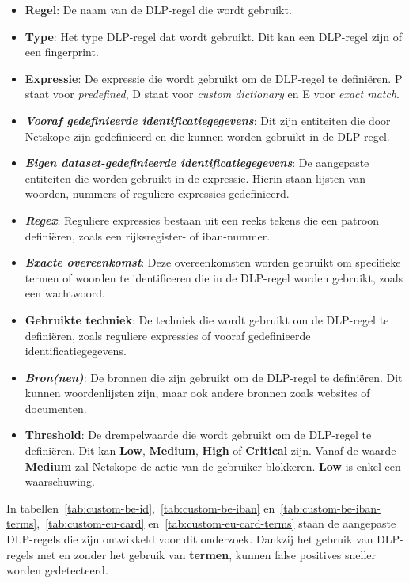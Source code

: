 {\small
\begin{itemize}
    \item \textbf{Regel}: De naam van de DLP-regel die wordt gebruikt.
    \item \textbf{Type}: Het type DLP-regel dat wordt gebruikt. Dit kan een DLP-regel zijn of een fingerprint.
    \item \textbf{Expressie}: De expressie die wordt gebruikt om de DLP-regel te definiëren. P staat voor \textit{predefined}, D staat voor \textit{custom dictionary} en E voor \textit{exact match}.
    \item \textbf{\textit{Vooraf gedefinieerde identificatiegegevens}}: Dit zijn entiteiten die door Netskope zijn gedefinieerd en die kunnen worden gebruikt in de DLP-regel.
    \item \textbf{\textit{Eigen dataset-gedefinieerde identificatiegegevens}}: De aangepaste entiteiten die worden gebruikt in de expressie. Hierin staan lijsten van woorden, nummers of reguliere expressies gedefinieerd. 
    \item \textbf{\textit{Regex}}: Reguliere expressies bestaan uit een reeks tekens die een patroon definiëren, zoals een rijksregister- of \gls{iban}-nummer.
    \item \textbf{\textit{Exacte overeenkomst}}: Deze overeenkomsten worden gebruikt om specifieke termen of woorden te identificeren die in de DLP-regel worden gebruikt, zoals een wachtwoord.
    \item \textbf{Gebruikte techniek}: De techniek die wordt gebruikt om de DLP-regel te definiëren, zoals reguliere expressies of vooraf gedefinieerde identificatiegegevens.
    \item \textbf{\textit{Bron(nen)}}: De bronnen die zijn gebruikt om de DLP-regel te definiëren. Dit kunnen woordenlijsten zijn, maar ook andere bronnen zoals websites of documenten.
    \item \textbf{Threshold}: De drempelwaarde die wordt gebruikt om de DLP-regel te definiëren. Dit kan \textbf{Low}, \textbf{Medium}, \textbf{High} of \textbf{Critical} zijn. Vanaf de waarde \textbf{Medium} zal Netskope de actie van de gebruiker blokkeren. \textbf{Low} is enkel een waarschuwing.
\end{itemize}
}

In tabellen~\ref{tab:custom-be-id},~\ref{tab:custom-be-iban} en~\ref{tab:custom-be-iban-terms},~\ref{tab:custom-eu-card} en~\ref{tab:custom-eu-card-terms} staan de aangepaste DLP-regels die zijn ontwikkeld voor dit onderzoek. 
Dankzij het gebruik van DLP-regels met en zonder het gebruik van \textbf{termen}, kunnen false positives sneller worden gedetecteerd. 

